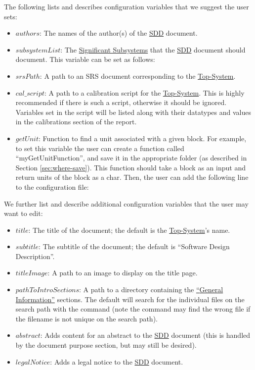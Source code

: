 \documentclass{mcscert}
\newcommand{\topsystemnolink}{Top-System} %
\newcommand{\topsystem}{\hyperref[def:topsystem]{\topsystemnolink{}}}
\newcommand{\sigsubsnolink}{Significant Subsystems} %
\newcommand{\sigsubs}{\hyperref[def:sigsubs]{\sigsubsnolink{}}}
\newcommand{\geninfonolink}{General Information}
\newcommand{\geninfo}{\hyperref[def:general-info]{\geninfonolink{}}}
\begin{document}
	The following lists and describes configuration variables that we suggest the user sets:
	\begin{itemize}
	  \item $authors$: The names of the author(s) of the \hyperref[acr:sdd]{SDD} document.
	  \item $subsystemList$: The \sigsubs{} that the \hyperref[acr:sdd]{SDD} document should document. 
	  This variable can be set as follows:\\
	  \item $srsPath$: A path to an SRS document corresponding to the \topsystem{}.
	  \item $cal\_script$: A path to a calibration script for the \topsystem{}. This is highly recommended if there is such a script, otherwise it should be ignored. Variables set in the script will be listed along with their datatypes and values in the calibrations section of the report.
	  \item $getUnit$: Function to find a unit associated with a given block. 
	  For example, to set this variable the user can create a function called ``myGetUnitFunction'', and save it in the appropriate folder (as described in Section \ref{sec:where-save}). 
	  This function should take a block as an input and return units of the block as a char. 
	  Then, the user can add the following line to the configuration file: 
	\end{itemize}
	
	We further list and describe additional configuration variables that the user	may want to edit:
	\begin{itemize}
		\item $title$: The title of the document; the default is the \topsystem{}'s name.
		\item $subtitle$: The subtitle of the document; the default is ``Software Design Description''.
		\item $titleImage$: A path to an image to display on the title page.
		\item $pathToIntroSections$: A path to a directory containing the \hyperref[def:general-info]{``\geninfo{}''} sections. 
		The default will search for the individual files on the \matlab{} search path with the  command (note the  command may find the wrong file if the filename is not unique on the search path).
		\item $abstract$: Adds content for an abstract to the \hyperref[acr:sdd]{SDD} document (this is handled by the document purpose section, but may still be desired).
		\item $legalNotice$: Adds a legal notice to the \hyperref[acr:sdd]{SDD} document.
	\end{itemize}
\end{document}
